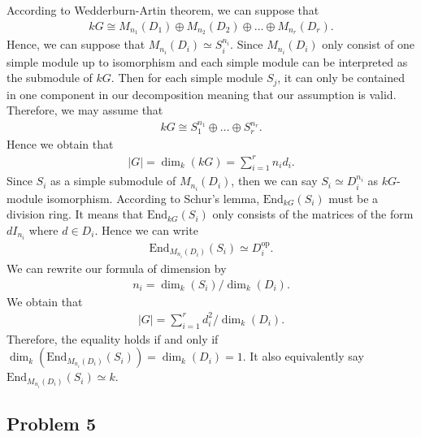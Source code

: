 \begin{solution}
    According to Wedderburn-Artin theorem, we can suppose that 
    \begin{align*}
        kG \cong M_{n_1}(D_1) \oplus M_{n_2}(D_2) \oplus \dots \oplus M_{n_r}(D_r).
    \end{align*}
    Hence, we can suppose that $M_{n_i}(D_i)\simeq S_i^{n_i}$. Since $M_{n_i}(D_i)$ only consist of one simple module up to isomorphism and each simple module can be interpreted as the 
    submodule of $kG$. Then for each simple module $S_j$, it can only be contained in one component in our decomposition meaning that our assumption is valid.
    Therefore, we may assume that 
    \begin{align*}
        kG \cong S_1^{n_1}\oplus \dots \oplus S_r^{n_r}.
    \end{align*}   
    Hence we obtain that 
    \begin{align*}
        |G|=\dim_k(kG) = \sum_{i=1}^r n_i d_i.
    \end{align*}
    Since $S_i$ as a simple submodule of $M_{n_i}(D_i)$, then we can say $S_i\simeq D_i^{n_i}$ as $kG$-module isomorphism.
    According to Schur's lemma, $\text{End}_{kG}(S_i)$ must be a division ring. It means that $\text{End}_{kG}(S_i)$ only
    consists of the matrices of the form $dI_{n_i}$ where $d\in D_i$. Hence we can write 
    \begin{align*}
        \text{End}_{M_{n_i}(D_i)}(S_i)\simeq D_i^{\text{op}}.
    \end{align*} 
    We can rewrite our formula of dimension by 
    \begin{align*}
        n_i=\dim_{k}(S_i)/\dim_k(D_i).
    \end{align*}
    We obtain that 
        \begin{align*}
        |G|= \sum_{i=1}^r d^2_i/\dim_k(D_i).
    \end{align*}
    Therefore, the equality holds if and only if $\dim_k(\text{End}_{M_{n_i}(D_i)}(S_i))= \dim_k(D_i)=1$.
    It also equivalently say $\text{End}_{M_{n_i}(D_i)}(S_i)\simeq k$.
\end{solution}


\subsection*{Problem 5}

